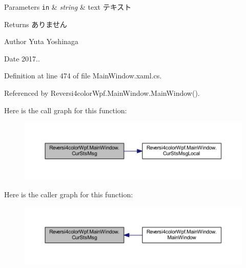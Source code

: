 \begin{DoxyParams}[1]{Parameters}
\mbox{\tt in}  & {\em string} & text テキスト \\
\hline
\end{DoxyParams}
\begin{DoxyReturn}{Returns}
ありません 
\end{DoxyReturn}
\begin{DoxyAuthor}{Author}
Yuta Yoshinaga 
\end{DoxyAuthor}
\begin{DoxyDate}{Date}
2017.. 
\end{DoxyDate}


Definition at line 474 of file Main\+Window.\+xaml.\+cs.



Referenced by Reversi4color\+Wpf.\+Main\+Window.\+Main\+Window().

Here is the call graph for this function\+:
\nopagebreak
\begin{figure}[H]
\begin{center}
\leavevmode
\includegraphics[width=350pt]{class_reversi4color_wpf_1_1_main_window_a5aacc83414f6c239899ee02e2ee8d9df_cgraph}
\end{center}
\end{figure}
Here is the caller graph for this function\+:
\nopagebreak
\begin{figure}[H]
\begin{center}
\leavevmode
\includegraphics[width=350pt]{class_reversi4color_wpf_1_1_main_window_a5aacc83414f6c239899ee02e2ee8d9df_icgraph}
\end{center}
\end{figure}
\mbox{\label{class_reversi4color_wpf_1_1_main_window_a8b1203cb8245c891c935e60a2efead72}} 
